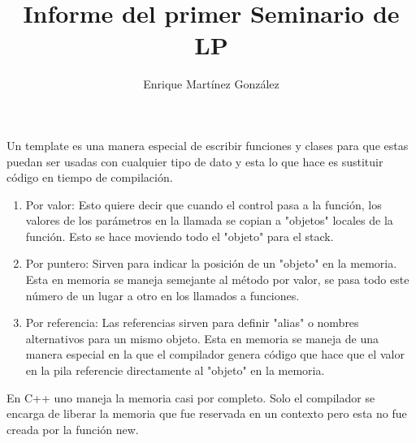 \documentclass[]{article}
\title{Informe del primer Seminario de LP}
\author{Enrique Martínez González}
\date{}
\begin{document}
    \maketitle

    \begin{section}{}
        \begin{subsection}{}
            Un template es una manera especial de escribir funciones y clases para que estas puedan ser usadas con cualquier tipo de dato y esta lo que hace es sustituir código en tiempo de compilación.
        \end{subsection}
    \end{section}

    \begin{section}{}
        \begin{subsection}{}
            \begin{enumerate}
                \item Por valor: Esto quiere decir que cuando el control pasa a la función, los valores de los parámetros en la llamada se copian a "objetos" locales de la función. Esto se hace moviendo todo el "objeto" para el stack.
                \item Por puntero: Sirven para indicar la posición de un "objeto" en la memoria. Esta en memoria se maneja semejante al método por valor, se pasa todo este número de un lugar a otro en los llamados a funciones.
                \item Por referencia: Las referencias sirven para definir "alias" o nombres alternativos para un mismo objeto. Esta en memoria se maneja de una manera especial en la que el compilador genera código que hace que el valor en la pila referencie directamente al "objeto" en la memoria.
            \end{enumerate}
        \end{subsection} 
        \begin{subsection}{}
            En C++ uno maneja la memoria casi por completo. Solo el compilador se encarga de liberar la memoria que fue reservada en un contexto pero esta no fue creada por la función new.
        \end{subsection}
    \end{section}
\end{document}
